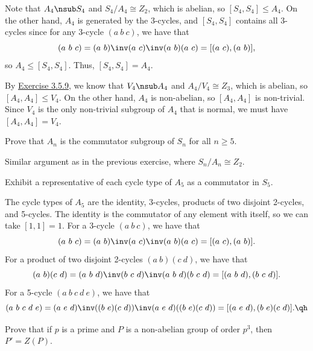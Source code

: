 \begin{sol}
    Note that $A_4 \nsub S_4$ and $S_4/A_4 \cong Z_2$, which is abelian, so $[S_4, S_4] \leq A_4$. On the other hand, $A_4$ is generated by the 3-cycles, and $[S_4, S_4]$ contains all 3-cycles since for any 3-cycle $(a\ b\ c)$, we have that
    \[(a\ b\ c) = (a\ b)\inv (a\ c)\inv (a\ b) (a\ c) = [(a\ c), (a\ b)],\]
    so $A_4 \leq [S_4, S_4]$. Thus, $[S_4, S_4] = A_4$. 

    By \hyperref[ex3.5.9]{Exercise 3.5.9}, we know that $V_4 \nsub A_4$ and $A_4/V_4 \cong Z_3$, which is abelian, so $[A_4, A_4] \leq V_4$. On the other hand, $A_4$ is non-abelian, so $[A_4, A_4]$ is non-trivial. Since $V_4$ is the only non-trivial subgroup of $A_4$ that is normal, we must have $[A_4, A_4] = V_4$. \qh
\end{sol}

\begin{exercise}\label{ex5.4.5}
    Prove that $A_n$ is the commutator subgroup of $S_n$ for all $n \geq 5$.
\end{exercise}

\begin{sol}
    Similar argument as in the previous exercise, where $S_n/A_n \cong Z_2$.
\end{sol}

\newpage

\begin{exercise}\label{ex5.4.6}
    Exhibit a representative of each cycle type of $A_5$ as a commutator in $S_5$.
\end{exercise}

\begin{sol}
    The cycle types of $A_5$ are the identity, 3-cycles, products of two disjoint 2-cycles, and 5-cycles. The identity is the commutator of any element with itself, so we can take $[1, 1] = 1$. For a 3-cycle $(a\ b\ c)$, we have that
    \[(a\ b\ c) = (a\ b)\inv (a\ c)\inv (a\ b) (a\ c) = [(a\ c), (a\ b)].\]
    For a product of two disjoint 2-cycles $(a\ b)(c\ d)$, we have that
    \[(a\ b)(c\ d) = (a\ b\ d)\inv (b\ c\ d)\inv (a\ b\ d) (b\ c\ d) = [(a\ b\ d), (b\ c\ d)].\]
    For a 5-cycle $(a\ b\ c\ d\ e)$, we have that
    \[(a\ b\ c\ d\ e) = (a\ e\ d)\inv ((b\ e)(c\ d))\inv (a\ e\ d) ((b\ e)(c\ d)) = [(a\ e\ d), (b\ e)(c\ d)]. \qh\]
\end{sol}

\begin{exercise}\label{ex5.4.7}
    Prove that if $p$ is a prime and $P$ is a non-abelian group of order $p^3$, then $P' = Z(P)$.
\end{exercise}

